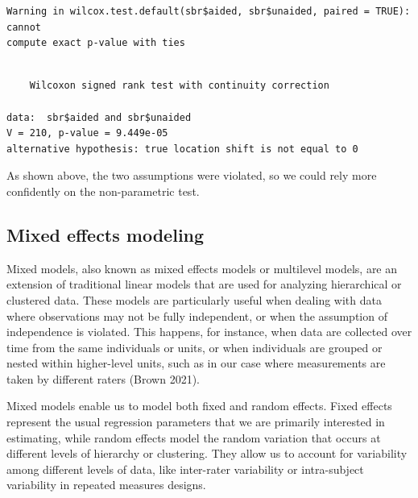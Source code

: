 \documentclass[
  letterpaper,
]{book}
\newenvironment{Shaded}{\begin{snugshade}}{\end{snugshade}}
\newcommand{\AttributeTok}[1]{\textcolor[rgb]{0.40,0.45,0.13}{#1}}
\newcommand{\CommentTok}[1]{\textcolor[rgb]{0.37,0.37,0.37}{#1}}
\newcommand{\ConstantTok}[1]{\textcolor[rgb]{0.56,0.35,0.01}{#1}}
\newcommand{\FunctionTok}[1]{\textcolor[rgb]{0.28,0.35,0.67}{#1}}
\newcommand{\NormalTok}[1]{\textcolor[rgb]{0.00,0.23,0.31}{#1}}
\newcommand{\SpecialCharTok}[1]{\textcolor[rgb]{0.37,0.37,0.37}{#1}}
\begin{document}
\begin{Shaded}
\end{Shaded}

\begin{verbatim}
Warning in wilcox.test.default(sbr$aided, sbr$unaided, paired = TRUE): cannot
compute exact p-value with ties
\end{verbatim}

\begin{verbatim}

    Wilcoxon signed rank test with continuity correction

data:  sbr$aided and sbr$unaided
V = 210, p-value = 9.449e-05
alternative hypothesis: true location shift is not equal to 0
\end{verbatim}

As shown above, the two assumptions were violated, so we could rely more
confidently on the non-parametric test.

\hypertarget{mixed-effects-modeling}{%
\subsection{Mixed effects modeling}\label{mixed-effects-modeling}}

Mixed models, also known as mixed effects models or multilevel models,
are an extension of traditional linear models that are used for
analyzing hierarchical or clustered data. These models are particularly
useful when dealing with data where observations may not be fully
independent, or when the assumption of independence is violated. This
happens, for instance, when data are collected over time from the same
individuals or units, or when individuals are grouped or nested within
higher-level units, such as in our case where measurements are taken by
different raters (Brown 2021).

Mixed models enable us to model both fixed and random effects. Fixed
effects represent the usual regression parameters that we are primarily
interested in estimating, while random effects model the random
variation that occurs at different levels of hierarchy or clustering.
They allow us to account for variability among different levels of data,
like inter-rater variability or intra-subject variability in repeated
measures designs.
\end{document}
